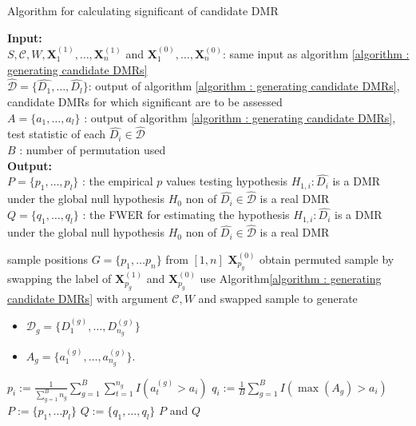 \documentclass{report}
\begin{document}
\begin{algorithm}
    \caption{Algorithm for calculating significant of candidate DMR \cite{wang2017accounting}} \label{algorithm : Assess significance}
    \hspace*{0.02in} {\bf Input:} \\
     $S, \mathcal{C}, W, \mathbf{X}_1^{(1)}, \ldots, \mathbf{X}_n^{(1)}$ and $\mathbf{X}_1^{(0)}, \ldots, \mathbf{X}_n^{(0)}$: same input as algorithm \ref{algorithm : generating candidate DMRs} \\
     ${\hat{\mathcal{D}}} = \{\hat{D_1},\ldots,\hat{D_l}\}$: output of algorithm \ref{algorithm : generating candidate DMRs}, candidate DMRs for which significant are to be assessed \\
     $A = \{a_1,\ldots,a_l\}$ : output of algorithm \ref{algorithm : generating candidate DMRs}, test statistic of each $\hat{D_i} \in \hat{\mathcal{D}}$ \\
     $B$ : number of permutation used \\ 
     \hspace*{0.02in} {\bf Output:} \\
    $P = \{p_1,\ldots,p_l\}$ : the empirical $p$ values testing hypothesis $H_{1,i} : \hat{D_i}$ is a DMR under the global null hypothesis $H_0$ non of $\hat{D_i} \in \hat{\mathcal{D}}$ is a real DMR \\
    $Q = \{q_1,\ldots, q_l\}$ : the FWER for estimating the hypothesis $H_{1,i} : \hat{D_i}$ is a DMR under the global null hypothesis $H_0$ non of $\hat{D_i} \in \hat{\mathcal{D}}$ is a real DMR \\
\begin{algorithmic}[1] 
     
        \State sample positions  $G = \{p_1,\ldots p_n\}$ from $[1,n]$
          $\mathbf{X}_{p_g}^{(0)}$  
            \State obtain permuted sample by swapping the label of $\mathbf{X}_{p_g}^{(1)}$ and $\mathbf{X}_{p_g}^{(0)}$  
        \EndFor
        \State use Algorithm\ref{algorithm : generating candidate DMRs} with argument $ \mathcal{C}, W$ and swapped sample to generate
            \begin{itemize}
               \item  $\mathcal{D}_g = \{D_1^{(g)}, \ldots, D_{n_g}^{(g)}\}$
                \item $A_g = \{a_1^{(g)}, \ldots, a_{n_g}^{(g)}\}$.
            \end{itemize}
    \EndFor 

     
        \State $p_i := \frac{1}{\sum_{g=1}^B n_g}\sum_{g=1}^B \sum_{t=1}^{n_g} I(a_t^{(g)} > a_i)$
        \State $q_i := \frac{1}{B} \sum_{g=1}^B I( \max(A_g) >a_i)$
    \EndFor
    \State $P := \{ p_1,\ldots p_l\}$
    \State $Q := \{q_1,\ldots,q_l\}$
    \State \Return $P$ and $Q$
    \end{algorithmic}
\end{algorithm}
   
\end{document}
